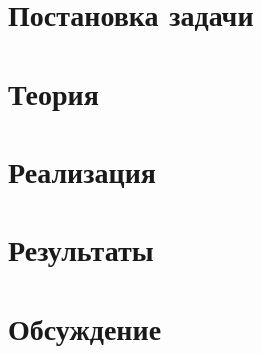 \section{Постановка задачи}

\newpage

\section{Теория}

\newpage

\section{Реализация}


\section{Результаты}

\newpage

\section{Обсуждение}

\newpage


